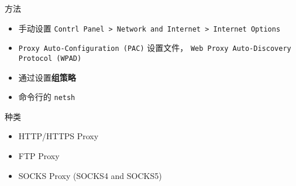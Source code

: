 
方法
\begin{itemize}
\item 手动设置 \verb`Contrl Panel > Network and Internet > Internet Options`
\item \verb`Proxy Auto-Configuration (PAC)` 设置文件， \verb`Web Proxy Auto-Discovery Protocol (WPAD)`
\item 通过设置\textbf{组策略}
\item 命令行的 \verb`netsh`
\end{itemize}

种类
\begin{itemize}
\item HTTP/HTTPS Proxy
\item FTP Proxy
\item SOCKS Proxy (SOCKS4 and SOCKS5)
\end{itemize}
